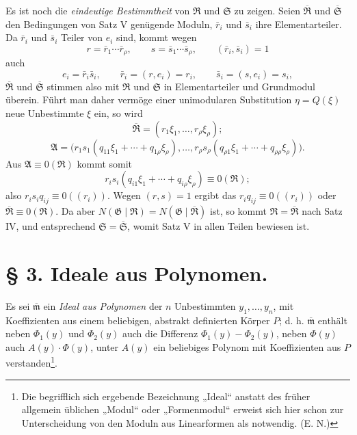 \documentclass[11pt]{article}
\newcommand{\Amod}{\mathfrak A}
\newcommand{\Gmod}{\mathfrak G}
\newcommand{\Rmod}{\mathfrak R}
\newcommand{\Smod}{\mathfrak S}
\newcommand{\mideal}{\mathfrak m}
\newcommand{\zero}[1]{\equiv 0(#1)}
\newcommand{\Norm}{N}
\begin{document}
Es ist noch die \emph{eindeutige Bestimmtheit} von $\Rmod$ und $\Smod$ zu zeigen. Seien $\overline{\Rmod}$ und $\overline{\Smod}$ den Bedingungen von Satz V genügende Moduln, $\bar r_i$ und $\bar s_i$ ihre Elementarteiler. Da $\bar r_i$ und $\bar s_i$ Teiler von $e_i$ sind, kommt wegen
\[
 r=\bar r_1\cdots\bar r_\rho,
 \qquad
 s=\bar s_1\cdots\bar s_\rho,
 \qquad
 (\bar r_i,\bar s_i)=1
\]
auch
\[
 e_i=\bar r_i\bar s_i,
 \qquad
 \bar r_i=(r,e_i)=r_i,
 \qquad
 \bar s_i=(s,e_i)=s_i,
\]
$\overline{\Rmod}$ und $\overline{\Smod}$ stimmen also mit $\Rmod$ und $\Smod$ in Elementarteiler und Grundmodul überein. Führt man daher vermöge einer unimodularen Substitution $\eta=Q(\xi)$ neue Unbestimmte $\xi$ ein, so wird
\[
 \overline{\Rmod}=(r_1\xi_1,\ldots,r_\rho\xi_\rho);
\]
\[
 \Amod=\bigl(r_1s_1(q_{11}\xi_1+\cdots+q_{1\rho}\xi_\rho),\ldots,
 r_\rho s_\rho(q_{\rho1}\xi_1+\cdots+q_{\rho\rho}\xi_\rho)\bigr).
\]
Aus $\Amod\zero{\Rmod}$ kommt somit
\[
 r_i s_i(q_{i1}\xi_1+\cdots+q_{i\rho}\xi_\rho)\zero{\Rmod};
\]
also $r_is_iq_{ij}\zero{(r_i)}$. Wegen $(r,s)=1$ ergibt das $r_iq_{ij}\zero{(r_i)}$ oder $\overline{\Rmod}\zero{\Rmod}$. Da aber $\Norm(\Gmod\mid\Rmod)=\Norm(\Gmod\mid\overline{\Rmod})$ ist, so kommt $\Rmod=\overline{\Rmod}$ nach Satz IV, und entsprechend $\Smod=\overline{\Smod}$, womit Satz V in allen Teilen bewiesen ist.

\section*{§ 3. Ideale aus Polynomen.}

Es sei $\overline{\mideal}$ ein \emph{Ideal aus Polynomen} der $n$ Unbestimmten $y_1,\ldots,y_n$, mit Koeffizienten aus einem beliebigen, abstrakt definierten Körper $P$; d. h. $\overline{\mideal}$ enthält neben $\Phi_1(y)$ und $\Phi_2(y)$ auch die Differenz $\Phi_1(y)-\Phi_2(y)$, neben $\Phi(y)$ auch $A(y)\cdot\Phi(y)$, unter $A(y)$ ein beliebiges Polynom mit Koeffizienten aus $P$ verstanden\footnote{Die begrifflich sich ergebende Bezeichnung „Ideal“ anstatt des früher allgemein üblichen „Modul“ oder „Formenmodul“ erweist sich hier schon zur Unterscheidung von den Moduln aus Linearformen als notwendig. (E. N.)}.
\end{document}
